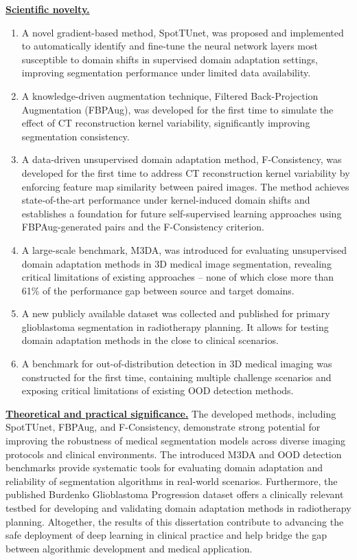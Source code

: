 \underline{\textbf{Scientific novelty.}}%
\begin{enumerate}
	\item A novel gradient-based method, SpotTUnet, was proposed and implemented to automatically identify and fine-tune the neural network layers most susceptible to domain shifts in supervised domain adaptation settings, improving segmentation performance under limited data availability.
	\item A knowledge-driven augmentation technique, Filtered Back-Projection Augmentation (FBPAug), was developed for the first time to simulate the effect of CT reconstruction kernel variability, significantly improving segmentation consistency.
	\item A data-driven unsupervised domain adaptation method, F-Consistency, was developed for the first time to address CT reconstruction kernel variability by enforcing feature map similarity between paired images. The method achieves state-of-the-art performance under kernel-induced domain shifts and establishes a foundation for future self-supervised learning approaches using FBPAug-generated pairs and the F-Consistency criterion.
	\item A large-scale benchmark, M3DA, was introduced for evaluating unsupervised domain adaptation methods in 3D medical image segmentation, revealing critical limitations of existing approaches – none of which close more than 61\% of the performance gap between source and target domains.
	\item A new publicly available dataset was collected and published for primary glioblastoma segmentation in radiotherapy planning. It allows for testing domain adaptation methods in the close to clinical scenarios.
	\item A benchmark for out-of-distribution detection in 3D medical imaging was constructed for the first time, containing multiple challenge scenarios and exposing critical limitations of existing OOD detection methods.
\end{enumerate}


\underline{\textbf{Theoretical and practical significance.}}
The developed methods, including SpotTUnet, FBPAug, and F-Consistency, demonstrate strong potential for improving the robustness of medical segmentation models across diverse imaging protocols and clinical environments. The introduced M3DA and OOD detection benchmarks provide systematic tools for evaluating domain adaptation and reliability of segmentation algorithms in real-world scenarios. Furthermore, the published Burdenko Glioblastoma Progression dataset offers a clinically relevant testbed for developing and validating domain adaptation methods in radiotherapy planning. Altogether, the results of this dissertation contribute to advancing the safe deployment of deep learning in clinical practice and help bridge the gap between algorithmic development and medical application.


